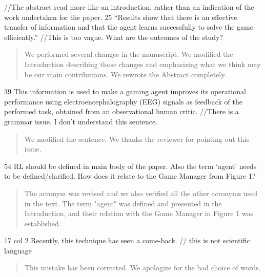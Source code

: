 \documentclass[journal,onecolumn,12pt]{IEEEtran}
\begin{document}
//The abstract read more like an introduction, rather than an indication of the work undertaken for the paper.
25 “Results show that there is an effective transfer of information and that
the agent learns successfully to solve the game efficiently.”
//This is too vague. What are the outcomes of the study?

\vspace{2em}
\begin{quotation}
{\color{blue}
We performed several changes in the manuscript.  We modified the Introduction describing those changes and emphasizing what we think may be our main contributions.  We rewrote the Abstract completely.
}
\end{quotation}
\vspace{2em}

39 This information is used to make a gaming agent improves its operational performance using electroencephalography (EEG) signals as feedback of the performed task, obtained from an observational human critic.
//There is a grammar issue. I don’t understand this sentence.

\vspace{2em}
\begin{quotation}
{\color{blue}
We modified the sentence.  We thanks the reviewer for pointing out this issue.
}
\end{quotation}
\vspace{2em}

54 RL should be defined in main body of the paper. Also the term ‘agent’ needs to be defined/clarified. How does it relate to the Game Manager from Figure 1?

\vspace{2em}
\begin{quotation}
{\color{blue}
The acronym was revised and we also verified all the other acronyms used in the text.  The term "agent" was defined and presented in the Introduction, and their relation with the Game Manager in Figure 1 was established.
}
\end{quotation}
\vspace{2em}

17 col 2 Recently, this technique has seen a come-back. // this is not scientific language

\vspace{2em}
\begin{quotation}
{\color{blue}
This mistake has been corrected.  We apologize for the bad choice of words.
}
\end{quotation}
\vspace{2em}
\end{document}

